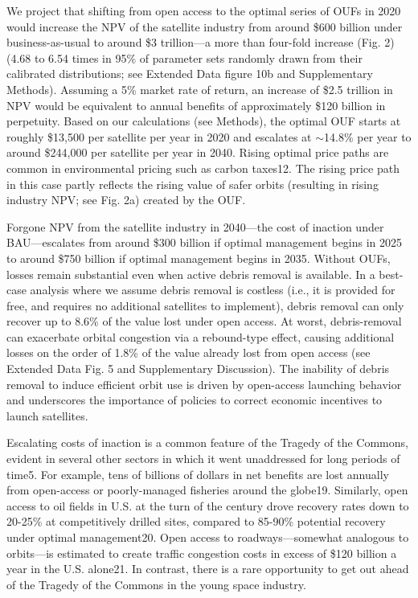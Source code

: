 \documentclass[9pt,twocolumn,twoside,lineno]{pnas-new}
\begin{document}
We project that shifting from open access to the optimal series of OUFs in 2020 would increase the NPV of the satellite industry from around \$600 billion under business-as-usual to around \$3 trillion—a more than four-fold increase (Fig. 2) (4.68 to 6.54 times in 95\% of parameter sets randomly drawn from their calibrated distributions; see Extended Data figure 10b and Supplementary Methods). Assuming a 5\% market rate of return, an increase of \$2.5 trillion in NPV would be equivalent to annual benefits of approximately \$120 billion in perpetuity. Based on our calculations (see Methods), the optimal OUF starts at roughly \$13,500 per satellite per year in 2020 and escalates at $\sim$14.8\% per year to around \$244,000 per satellite per year in 2040. Rising optimal price paths are common in environmental pricing such as carbon taxes12. The rising price path in this case partly reflects the rising value of safer orbits (resulting in rising industry NPV; see Fig. 2a) created by the OUF.

Forgone NPV from the satellite industry in 2040—the cost of inaction under BAU—escalates from around \$300 billion if optimal management begins in 2025 to around \$750 billion if optimal management begins in 2035. Without OUFs, losses remain substantial even when active debris removal is available. In a best-case analysis where we assume debris removal is costless (i.e., it is provided for free, and requires no additional satellites to implement), debris removal can only recover up to 8.6\% of the value lost under open access. At worst, debris-removal can exacerbate orbital congestion via a rebound-type effect, causing additional losses on the order of 1.8\% of the value already lost from open access (see Extended Data Fig. 5 and Supplementary Discussion). The inability of debris removal to induce efficient orbit use is driven by open-access launching behavior and underscores the importance of policies to correct economic incentives to launch satellites.

Escalating costs of inaction is a common feature of the Tragedy of the Commons, evident in several other sectors in which it went unaddressed for long periods of time5. For example, tens of billions of dollars in net benefits are lost annually from open-access or poorly-managed fisheries around the globe19. Similarly, open access to oil fields in U.S. at the turn of the century drove recovery rates down to 20-25\% at competitively drilled sites, compared to 85-90\% potential recovery under optimal management20. Open access to roadways—somewhat analogous to orbits—is estimated to create traffic congestion costs in excess of \$120 billion a year in the U.S. alone21. In contrast, there is a rare opportunity to get out ahead of the Tragedy of the Commons in the young space industry.
\end{document}
